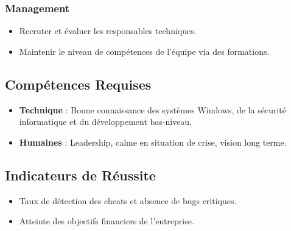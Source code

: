 \documentclass[12pt,a4paper]{article}
\begin{document}
\subsubsection{Management}
\begin{itemize}[label=\textbullet]
    \item Recruter et évaluer les responsables techniques.
    \item Maintenir le niveau de compétences de l'équipe via des formations.
\end{itemize}

\subsection{Compétences Requises}
\begin{itemize}[label=\textbullet]
    \item \textbf{Technique} : Bonne connaissance des systèmes Windows, de la sécurité informatique et du développement bas-niveau.
    \item \textbf{Humaines} : Leadership, calme en situation de crise, vision long terme.
\end{itemize}

\subsection{Indicateurs de Réussite}
\begin{itemize}[label=\textbullet]
    \item Taux de détection des cheats et absence de bugs critiques.
    \item Atteinte des objectifs financiers de l'entreprise.
\end{itemize}
\end{document}
